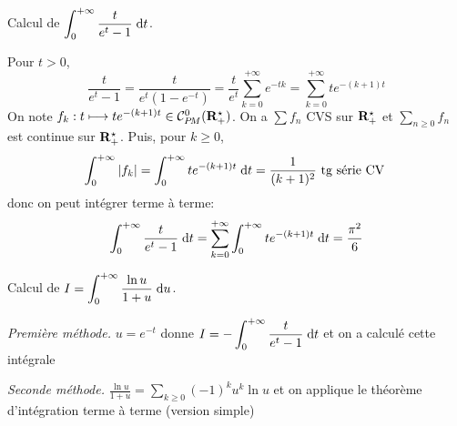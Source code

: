 \begin{ex}
    Calcul de $\displaystyle \int_0^{+\infty}\frac{t}{e^t-1}\;\mathrm{d} t$.

Pour $t>0$,  \[
    \frac{t}{e^t-1}=\frac{t}{e^t(1-e^{-t})}=\frac{t}{e^t}\sum_{k=0}^{+\infty}e^{-tk}=\sum_{k=0}^{+\infty}te^{-(k+1)t}
\] 
On note $f_k:t\longmapsto te^{-(k+1)t} \in  \CPM(\R_+^\star)$. On a $\sum f_n$ CVS sur $\mathbf R_+^\star$ et $\sum_{n\geq 0}f_n$ est  continue sur  $ \mathbf R_+^\star$. Puis, pour $k\geq 0$,  \[
    \int_0^{+\infty}|f_k|= \int_{0}^{+\infty} te^{-(k+1)t}\;\mathrm{d} t = \frac{1}{(k+1)^2} \text{ tg série CV }
\] 
donc on peut intégrer terme à terme: \[
    \int_{0}^{+\infty} \frac{t}{e^t-1}\;\mathrm{d} t=\sum_{k=0}^{+\infty}\int_0^{+\infty}te^{-(k+1)t}\;\mathrm{d} t=  \frac{\pi ^2}{6} 
\] 
\end{ex}

\begin{ex}
Calcul de $\displaystyle I= \int_{0}^{+\infty} \frac{\ln u}{1+u}\;\mathrm{d} u $.

\emph{Première méthode.} $u=e^{-t}$ donne $\displaystyle I=- \int_{0}^{+\infty}  \frac{t}{e^t-1}\;\mathrm{d} t$ et on a calculé cette intégrale

\emph{Seconde méthode.} $\displaystyle \frac{\ln u}{1+u}=\sum_{k\geq 0}(-1)^ku^k\ln u$ et on applique le théorème d'intégration terme à terme (version simple)
\end{ex}


